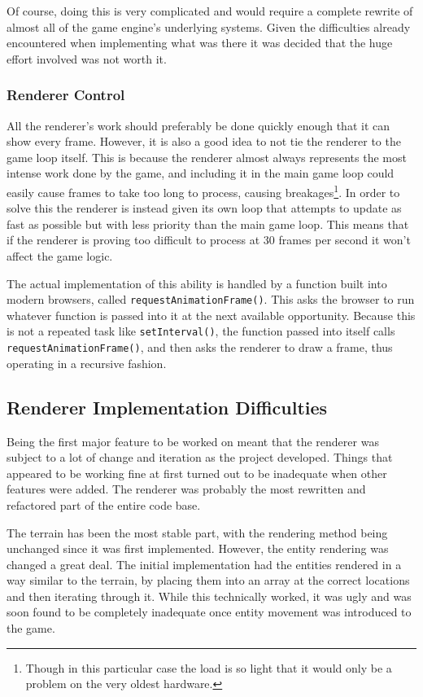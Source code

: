 Of course, doing this is very complicated and would require a complete rewrite of almost all of the game engine's underlying systems. Given the difficulties already encountered when implementing what was there it was decided that the huge effort involved was not worth it.

\subsubsection{Renderer Control}
All the renderer's work should preferably be done quickly enough that it can show every frame. However, it is also a good idea to not tie the renderer to the game loop itself. This is because the renderer almost always represents the most intense work done by the game, and including it in the main game loop could easily cause frames to take too long to process, causing breakages\footnote{Though in this particular case the load is so light that it would only be a problem on the very oldest hardware.}. In order to solve this the renderer is instead given its own loop that attempts to update as fast as possible but with less priority than the main game loop. This means that if the renderer is proving too difficult to process at 30 frames per second it won't affect the game logic.

The actual implementation of this ability is handled by a function built into modern browsers, called \texttt{requestAnimationFrame()}. This asks the browser to run whatever function is passed into it at the next available opportunity. Because this is not a repeated task like \texttt{setInterval()}, the function passed into itself calls \texttt{requestAnimationFrame()}, and then asks the renderer to draw a frame, thus operating in a recursive fashion.

\subsection{Renderer Implementation Difficulties}
Being the first major feature to be worked on meant that the renderer was subject to a lot of change and iteration as the project developed. Things that appeared to be working fine at first turned out to be inadequate when other features were added. The renderer was probably the most rewritten and refactored part of the entire code base.

The terrain has been the most stable part, with the rendering method being unchanged since it was first implemented. However, the entity rendering was changed a great deal. The initial implementation had the entities rendered in a way similar to the terrain, by placing them into an array at the correct locations and then iterating through it. While this technically worked, it was ugly and was soon found to be completely inadequate once entity movement was introduced to the game.

